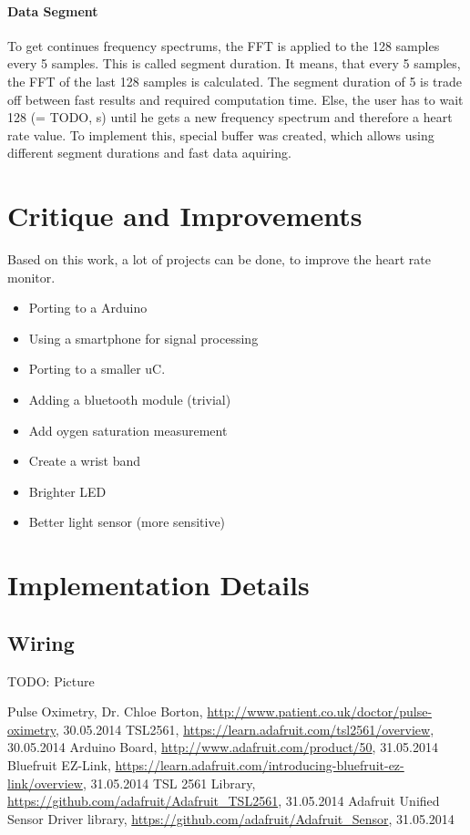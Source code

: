 \documentclass[oneside, notitlepage]{scrreprt}
\begin{document}
\subsubsection{Data Segment}
To get continues frequency spectrums, the FFT is applied to the 128 samples every 5 samples. This is called segment duration. It means, that every 5 samples, the FFT of the last 128 samples is calculated.
The segment duration of 5 is trade off between fast results and required computation time. Else, the user has to wait 128 (= TODO, s) until he gets a new frequency spectrum and therefore a heart rate value.
To implement this, special buffer was created, which allows using different segment durations and fast data aquiring.

\chapter{Critique and Improvements}
Based on this work, a lot of projects can be done, to improve the heart rate monitor.

\begin{itemize}
	\item{Porting to a Arduino}
	\item{Using a smartphone for signal processing}
	\item{Porting to a smaller uC.}
	\item{Adding a bluetooth module (trivial)}
	\item{Add oygen saturation measurement}
	\item{Create a wrist band}
	\item{Brighter LED}
	\item{Better light sensor (more sensitive)}
\end{itemize}

\chapter{Implementation Details}
\label{chap:impl-details}

\section{Wiring}
\label{sec:wiring}
TODO: Picture

\begin{thebibliography}{999}
	 Pulse Oximetry, Dr. Chloe Borton, \url{http://www.patient.co.uk/doctor/pulse-oximetry}, 30.05.2014
	 TSL2561, \url{https://learn.adafruit.com/tsl2561/overview}, 30.05.2014
	 Arduino Board, \url{http://www.adafruit.com/product/50}, 31.05.2014
	 Bluefruit EZ-Link, \url{https://learn.adafruit.com/introducing-bluefruit-ez-link/overview}, 31.05.2014
	 TSL 2561 Library, \url{https://github.com/adafruit/Adafruit_TSL2561}, 31.05.2014
	 Adafruit Unified Sensor Driver library, \url{https://github.com/adafruit/Adafruit_Sensor}, 31.05.2014
\end{thebibliography}

\cleardoublepage
{}
\listoffigures
\end{document}
